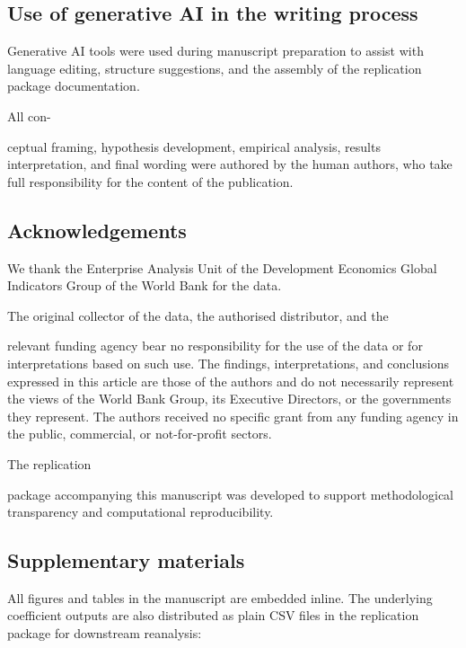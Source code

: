 \documentclass[12pt,a4paper]{article}
\begin{document}
\hypertarget{use-of-generative-ai-in-the-writing-process}{%
\subsection{Use of generative AI in the writing
process}\label{use-of-generative-ai-in-the-writing-process}}

Generative AI tools were used during manuscript preparation to assist
with language editing, structure suggestions, and the assembly of the
replication package documentation.

All con-

ceptual framing, hypothesis development, empirical analysis, results
interpretation, and final wording were authored by the human authors,
who take full responsibility for the content of the publication.

\hypertarget{acknowledgements}{%
\subsection{Acknowledgements}\label{acknowledgements}}

We thank the Enterprise Analysis Unit of the Development Economics
Global Indicators Group of the World Bank for the data.

The original collector of the data, the authorised distributor, and the

relevant funding agency bear no responsibility for the use of the data
or for interpretations based on such use. The findings, interpretations,
and conclusions expressed in this article are those of the authors and
do not necessarily represent the views of the World Bank Group, its
Executive Directors, or the governments they represent. The authors
received no specific grant from any funding agency in the public,
commercial, or not-for-profit sectors.

The replication

package accompanying this manuscript was developed to support
methodological transparency and computational reproducibility.

\hypertarget{supplementary-materials}{%
\subsection{Supplementary materials}\label{supplementary-materials}}

All figures and tables in the manuscript are embedded inline. The
underlying coefficient outputs are also distributed as plain CSV files
in the replication package for downstream reanalysis:
\end{document}
